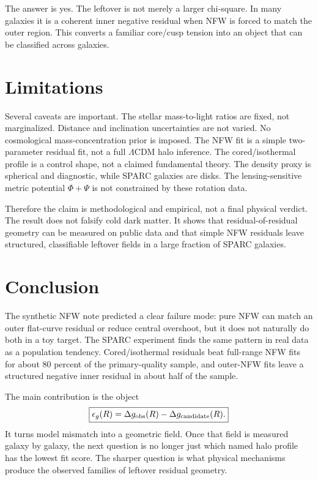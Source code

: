 \documentclass[10pt]{article}
\begin{document}
The answer is yes. The leftover is not merely a larger chi-square. In many
galaxies it is a coherent inner negative residual when NFW is forced to match
the outer region. This converts a familiar core/cusp tension
\citep{deBlok2010} into an object that can be classified across galaxies.

\section{Limitations}

Several caveats are important. The stellar mass-to-light ratios are fixed, not
marginalized. Distance and inclination uncertainties are not varied. No
cosmological mass-concentration prior is imposed. The NFW fit is a simple
two-parameter residual fit, not a full $\Lambda$CDM halo inference. The
cored/isothermal profile is a control shape, not a claimed fundamental theory.
The density proxy is spherical and diagnostic, while SPARC galaxies are disks.
The lensing-sensitive metric potential $\Phi+\Psi$ is not constrained by these
rotation data.

Therefore the claim is methodological and empirical, not a final physical
verdict. The result does not falsify cold dark matter. It shows that
residual-of-residual geometry can be measured on public data and that simple
NFW residuals leave structured, classifiable leftover fields in a large
fraction of SPARC galaxies.

\section{Conclusion}

The synthetic NFW note \citep{Landers2026b} predicted a clear failure mode:
pure NFW can match an outer flat-curve residual or reduce central overshoot,
but it does not naturally do both in a toy target. The SPARC experiment finds
the same pattern in real data as a population tendency. Cored/isothermal
residuals beat full-range NFW fits for about 80 percent of the primary-quality
sample, and outer-NFW fits leave a structured negative inner residual in about
half of the sample.

The main contribution is the object
\begin{equation}
\boxed{
\epsilon_g(R)
=
\Delta g_{\rm obs}(R)
-
\Delta g_{\rm candidate}(R).
}
\end{equation}
It turns model mismatch into a geometric field. Once that field is measured
galaxy by galaxy, the next question is no longer just which named halo profile
has the lowest fit score. The sharper question is what physical mechanisms
produce the observed families of leftover residual geometry.
\end{document}
